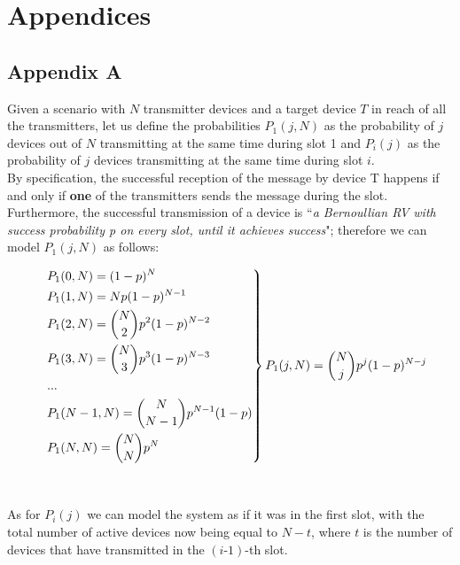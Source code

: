 %
\chapter{Appendices}

\section*{Appendix A}
Given a scenario with $N$ transmitter devices and a target device $T$ in reach of all the transmitters, let us define the probabilities $P_{1}(j, N)$ as the probability of $j$ devices out of $N$ transmitting at the same time during slot 1 and $P_{i}(j)$ as the probability of $j$ devices transmitting at the same time during slot $i$.\\
By specification, the successful reception of the message by device T happens if and only if \textbf{one} of the transmitters sends the message during the slot.
Furthermore, the successful transmission of a device is ``\textit{a Bernoullian RV with success probability \emph{p} on every slot, until it achieves success}"; therefore we can model $P_{1}(j, N)$ as 
follows:

\[
\begin{drcases}
    &P_{1}(0, N) = (1-p)^{N} \\
    &P_{1}(1, N) = N p(1-p)^{N-1}\\
    &P_{1}(2, N) = {N\choose2}p^{2}(1-p)^{N-2}\\
	&P_{1}(3, N) = {N\choose3}p^{3}(1-p)^{N-3}\\
	&...\\
	&P_{1}(N-1, N) = {N\choose N-1}p^{N-1}(1-p)\\
	&P_{1}(N, N) = {N\choose N}p^{N}\\
\end{drcases}
P_{1}(j, N) = {N\choose j} p^{j} (1-p)^{N-j}
\]
\\
\\
As for $P_{i}(j)$ we can model the system as if it was in the first slot, with the total number of active devices now being equal to $N-t$, where $t$ is the number of devices that have transmitted in the $(i\text{-}1)$-th slot.

